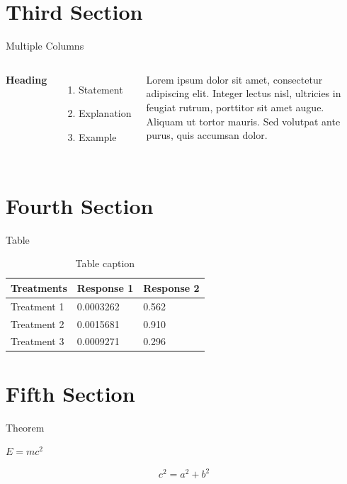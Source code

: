 \documentclass[aspectratio=169,xcolor=dvipsnames]{beamer}
\begin{document}
\section{Third Section}
\begin{frame}{Multiple Columns}
    \begin{columns}[c]
        \textbf{Heading}
        \begin{enumerate}
            \item Statement
            \item Explanation
            \item Example
        \end{enumerate}

        Lorem ipsum dolor sit amet, consectetur adipiscing elit. Integer lectus nisl, ultricies in feugiat rutrum, porttitor sit amet augue. Aliquam ut tortor mauris. Sed volutpat ante purus, quis accumsan dolor.
    \end{columns}
\end{frame}


\section{Fourth Section}
\begin{frame}{Table}
    \begin{table}
        \begin{tabular}{l l l}
            \toprule
            \textbf{Treatments} & \textbf{Response 1} & \textbf{Response 2} \\
            \midrule
            Treatment 1         & 0.0003262           & 0.562               \\
            Treatment 2         & 0.0015681           & 0.910               \\
            Treatment 3         & 0.0009271           & 0.296               \\
            \bottomrule
        \end{tabular}
        \caption{Table caption}
    \end{table}
\end{frame}

\section{Fifth Section}
\begin{frame}{Theorem}
    \begin{theorem}
        $E = mc^2$
    \end{theorem}
    \begin{equation}
        c^{2} = a^{2} + b^{2}
    \end{equation}
\end{frame}
\end{document}
